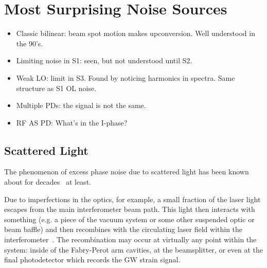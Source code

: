 






\section{Most Surprising Noise Sources}

\begin{itemize}
  \item Classic bilinear: beam spot motion makes upconversion. Well understood in the 90's.
  \item Limiting noise in S1: seen, but not understood until S2.
  \item Weak LO: limit in S3. Found by noticing harmonics in spectra. Same structure as S1 OL noise.
  \item Multiple PDs: the signal is not the same.
  \item RF AS PD: What's in the I-phase?
\end{itemize}


\subsection{Scattered Light}
The phenomenon of excess phase noise due to scattered light has been known about for
decades~\cite{Schilling:1981} at least.

Due to imperfections in the optics, for example, a small fraction of the laser light escapes from
the main interferometer beam path. This light then interacts with something (e.g. a piece of the
vacuum system or some other suspended optic or beam baffle) and then recombines with the
circulating laser field within the
interferometer~\cite{Kip:Scatter95, Kip:scatter1989, Sam:Scatter2012, Stefano:Scatter, Vinet:scatter, fritschel1998high}.
The recombination may occur at virtually any point within the system: inside of the
Fabry-Perot arm cavities, at the beamsplitter, or even at the final photodetector which
records the GW strain signal.

